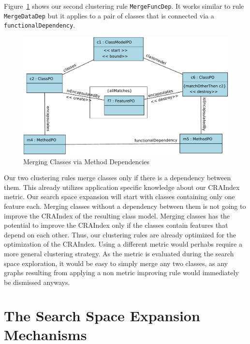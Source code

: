 \documentclass[submission,copyright,creativecommons]{eptcs}
\begin{document}
Figure~\ref{fig:MergeMethodRule} shows our second clustering rule \texttt{MergeFuncDep}. 
It works similar to rule \texttt{MergeDataDep} but it applies to a pair of classes that
is connected via a \texttt{functionalDependency}. 

\begin{figure}[ht] \centering
	\includegraphics[width=\linewidth]{images/RuleMergeMethodDep.pdf}
 \caption{Merging Classes via Method Dependencies}
 \label{fig:MergeMethodRule}
\end{figure}

Our two clustering rules merge classes only if there is a dependency between them. 
This already utilizes application specific knowledge about our CRAIndex metric. Our 
search space expansion will start with classes containing only one feature each. Merging 
classes without a dependency between them is not going to improve the CRAIndex of 
the resulting class model. Merging classes has the potential to improve the CRAIndex only 
if the classes contain features that depend on each other. Thus, our clustering rules 
are already optimized for the optimization of the CRAIndex. Using a different metric would 
perhabs require a more general clustering strategy. As the metric is evaluated 
during the search space exploration, it would be easy to simply merge any two 
classes, as any graphs resulting from applying a non metric improving rule 
would immediately be dismissed anyways.


\section{The Search Space Expansion Mechanisms}
\label{sec:expansion}

 
\end{document}
